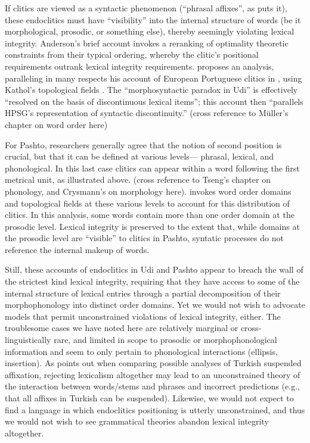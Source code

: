 \documentclass[output=paper]{langsci/langscibook}
\begin{document}
If clitics are viewed as a syntactic phenomenon (``phrasal affixes'', as \citet{Anderson2005} puts it), these endoclitics must have ``visibility'' into the internal structure of words (be it morphological, prosodic, or something else), thereby seemingly violating lexical integrity. Anderson's brief account invokes a reranking of optimality theoretic constraints from their typical ordering, whereby the clitic's positional requirements outrank lexical integrity requirements. \citet{Crysmann2000b} proposes an analysis, paralleling in many respects his account of European Portuguese clitics in \citet{Crysmann2000a}, using Kathol's topological fields \citep{Kathol1999}. The ``morphosyntactic paradox in Udi'' is effectively ``resolved on the basis of discontinuous lexical items''; this account then ``parallels HPSG's representation of syntactic discontinuity.''  (cross reference to M\"{u}ller's chapter on word order here)

For Pashto, researchers generally agree that the notion of second position is crucial, but that it can be defined at various levels--- phrasal, lexical, and phonological. In this last case clitics can appear within a word following the first metrical unit, as illustrated above. (cross reference to Tseng's chapter on phonology, and Crysmann's on morphology here). \citet{Dost2007} invokes word order domains \citep{Reape1994} and topological fields \citep{Kathol1999} at these various levels to account for this distribution of clitics. In this analysis, some words contain more than one order domain at the prosodic level. Lexical integrity is preserved to the extent that, while domains at the prosodic level are ``visible'' to clitics in Pashto, syntatic processes do not reference the internal makeup of words.

Still, these accounts of endoclitics in Udi and Pashto appear to breach the wall of the strictest kind lexical integrity, requiring that they have access to some of the internal structure of lexical entries through a partial decomposition of their morphophonology into distinct order domains. Yet we would not wish to advocate models that permit unconstrained violations of lexical integrity, either. The troublesome cases we have noted here are relatively marginal or cross-linguistically rare, and limited in scope to prosodic or morphophonological information and seem to only pertain to phonological interactions (ellipsis, insertion). As \citet{Broadwell2008} points out when comparing possible analyses of Turkish suspended affixation, rejecting lexicalism altogether may lead to an unconstrained theory of the interaction between words/stems and phrases and incorrect predictions (e.g., that all affixes in Turkish can be suspended). Likewise, we would not expect to find a language in which endoclitics positioning is utterly unconstrained, and thus we would not wish to see grammatical theories abandon lexical integrity altogether.
\end{document}
